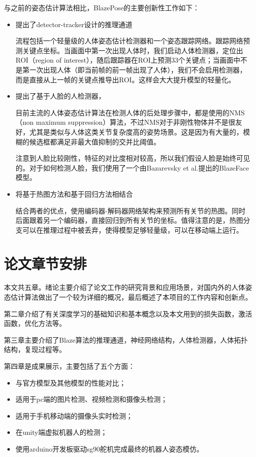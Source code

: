 与之前的姿态估计算法相比，BlazePose的主要创新性工作如下：

\begin{itemize}
\item 提出了detector-tracker设计的推理通道

\qquad \quad 流程包括一个轻量级的人体姿态估计检测器和一个姿态跟踪网络。跟踪网络预测关键点坐标。当画面中第一次出现人体时，我们启动人体检测器，定位出ROI（region of interest），随后跟踪器在ROI上预测33个关键点；当画面中不是第一次出现人体（即当前帧的前一帧出现了人体），我们不会启用检测器，而是直接从上一帧的关键点推导出ROI。这样会大大提升模型的轻量化。


\item 提出了基于人脸的人检测器，

\qquad \quad 目前主流的人体姿态估计算法在检测人体的后处理步骤中，都是使用的NMS（non maximum suppression）算法，不过NMS对于非刚性物体并不是很友好，尤其是类似与人体这类关节复杂度高的姿势场景。这是因为有大量的，模糊的候选框都满足非最大值抑制的交并比阈值。

\qquad \quad 注意到人脸比较刚性，特征的对比度相对较高，所以我们假设人脸是始终可见的。对于如何检测人脸，我们使用了一个由Bazarevsky et al.提出的BlazeFace\cite{bazarevsky2019blazeface}模型。

\item 将基于热图方法和基于回归方法相结合

\qquad \quad 结合两者的优点，使用编码器-解码器网络架构来预测所有关节的热图。同时后面跟着另一个编码器，直接回归到所有关节的坐标。值得注意的是，热图分支可以在推理过程中被丢弃，使得模型足够轻量级，可以在移动端上运行。
\end{itemize}

\section{论文章节安排}

本文共五章。绪论主要介绍了论文工作的研究背景和应用场景，对国内外的人体姿态估计算法做出了一个较为详细的概况，最后概述了本项目的工作内容和创新点。

第二章介绍了有关深度学习的基础知识和基本概念以及本文用到的损失函数，激活函数，优化方法等。

第三章主要介绍了Blaze算法的推理通道，神经网络结构，人体检测器，人体拓扑结构，复现过程等。

第四章是成果展示，主要包括了五个方面：

\begin{itemize}
\item 与官方模型及其他模型的性能对比；
\item 适用于pc端的图片检测、视频检测和摄像头检测；
\item 适用于手机移动端的摄像头实时检测；
\item 在unity端虚拟机器人的检测；
\item 使用arduino开发板驱动sg90舵机完成最终的机器人姿态模仿。
\end{itemize}

